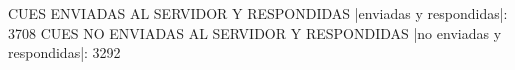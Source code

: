 CUES ENVIADAS AL SERVIDOR Y RESPONDIDAS
|enviadas y respondidas|: 3708
CUES NO ENVIADAS AL SERVIDOR Y RESPONDIDAS
|no enviadas y respondidas|: 3292